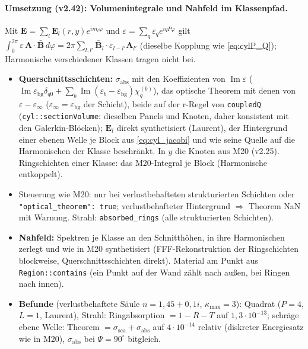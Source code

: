 \paragraph{Umsetzung (v2.42): Volumenintegrale und Nahfeld im Klassenpfad.}
Mit $\mathbf E=\sum_l\mathbf E_l(r,y)e^{im_l\varphi}$ und $\varepsilon=\sum_q\varepsilon_qe^{iqP\varphi}$ gilt
$\int_0^{2\pi}\varepsilon\,\mathbf A\cdot\bar{\mathbf B}\,d\varphi=2\pi\sum_{l,l'}\bar{\mathbf B}_l\cdot\varepsilon_{l-l'}\mathbf A_{l'}$
(dieselbe Kopplung wie \eqref{eq:cylP_Q}); Harmonische verschiedener Klassen tragen nicht bei.
\begin{itemize}[nosep]
  \item \textbf{Querschnittsschichten:} $\sigma_{\text{abs}}$ mit den Koeffizienten von $\operatorname{Im}\varepsilon$
        ($\operatorname{Im}\varepsilon_{\text{bg}}\delta_{q0}+\sum_b\operatorname{Im}(\varepsilon_b-\varepsilon_{\text{bg}})\chi^{(b)}_q$),
        das optische Theorem mit denen von $\varepsilon-\varepsilon_\infty$ ($\varepsilon_\infty=\varepsilon_{\text{bg}}$ der
        Schicht), beide auf der r-Regel von \verb|coupledQ| (\verb|cyl::sectionVolume|: dieselben Panels und Knoten, daher
        konsistent mit den Galerkin-Blöcken); $\mathbf E_l$ direkt synthetisiert (Laurent), der Hintergrund einer ebenen
        Welle je Block aus \eqref{eq:cyl_jacobi} und wie seine Quelle auf die Harmonischen der Klasse beschränkt. In $y$ die
        Knoten aus M20 (v2.25). Ringschichten einer Klasse: das M20-Integral je Block (Harmonische entkoppelt).
  \item Steuerung wie M20: nur bei verlustbehafteten strukturierten Schichten oder \verb|"optical_theorem": true|;
        verlustbehafteter Hintergrund $\Rightarrow$ Theorem NaN mit Warnung. Strahl: \verb|absorbed_rings| (alle
        strukturierten Schichten).
  \item \textbf{Nahfeld:} Spektren je Klasse an den Schnitthöhen, in ihre Harmonischen zerlegt und wie in M20 synthetisiert
        (FFF-Rekonstruktion der Ringschichten blockweise, Querschnittsschichten direkt). Material am Punkt aus
        \verb|Region::contains| (ein Punkt auf der Wand zählt nach außen, bei Ringen nach innen).
  \item \textbf{Befunde} (verlustbehaftete Säule $n=1{,}45+0{,}1i$, $\kappa_{\max}=3$): Quadrat ($P=4$, $L=1$, Laurent),
        Strahl: Ringabsorption $=1-R-T$ auf $1{,}3\cdot10^{-13}$; schräge ebene Welle: Theorem $=\sigma_{\text{sca}}+\sigma_{\text{abs}}$
        auf $4\cdot10^{-14}$ relativ (diskreter Energiesatz wie in M20), $\sigma_{\text{abs}}$ bei $\Psi=90^\circ$ bitgleich.

\end{itemize}
